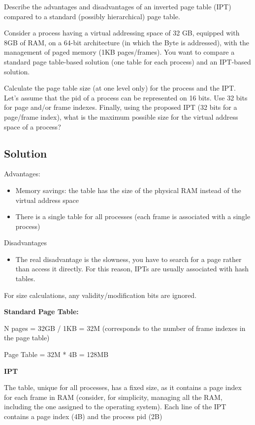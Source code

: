 Describe the advantages and disadvantages of an inverted page table (IPT) compared to a standard (possibly hierarchical) page table. 

Consider a process having a virtual addressing space of 32 GB, equipped with 8GB of RAM, on a 64-bit architecture (in which the Byte is addressed), with the management of paged memory (1KB pages/frames). You want to compare a standard page table-based solution (one table for each process) and an IPT-based solution. 

Calculate the page table size (at one level only) for the process and the IPT. Let's assume that the pid of a process can be represented on 16 bits. Use 32 bits for page and/or frame indexes. Finally, using the proposed IPT (32 bits for a page/frame index), what is the maximum possible size for the virtual address space of a process?

\subsection{Solution}

Advantages:
\begin{itemize}
\item Memory savings: the table has the size of the physical RAM instead of the virtual address space
\item There is a single table for all processes (each frame is associated with a single process)
\end{itemize}

Disadvantages
\begin{itemize}
\item The real disadvantage is the slowness, you have to search for a page rather than access it directly. For this reason, IPTs are usually associated with hash tables.
\end{itemize}

For size calculations, any validity/modification bits are ignored.

\textbf{Standard Page Table:}

N pages = 32GB / 1KB = 32M (corresponds to the number of frame indexes in the page table)

 Page Table = 32M * 4B = 128MB

\textbf{IPT}

The table, unique for all processes, has a fixed size, as it contains a page index for each frame in RAM (consider, for simplicity, managing all the RAM, including the one assigned to the operating system). Each line of the IPT contains a page index (4B) and the process pid (2B)

